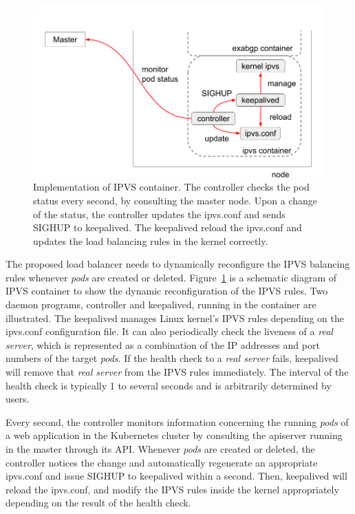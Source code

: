 \begin{figure}[h]
  \centering
  \includegraphics[width=0.9\columnwidth]{Figs/ipvs-ingress-schem}
  
    \par\bigskip
    \centering
    \begin{minipage}{0.9\columnwidth}
      \caption[Implementation of IPVS container]{
        Implementation of IPVS container.
        The controller checks the pod status every second, by consulting the master node.
        Upon a change of the status, the controller updates the ipvs.conf and sends SIGHUP to keepalived.
        The keepalived reload the ipvs.conf and updates the load balancing rules in the kernel correctly.
      }
      \label{fig:ipvs-ingress-schem}
    \end{minipage}
\end{figure}

The proposed load balancer needs to dynamically reconfigure the IPVS balancing rules whenever {\em pods} are created or deleted. 
Figure~\ref{fig:ipvs-ingress-schem} is a schematic diagram of IPVS container to show the dynamic reconfiguration of the IPVS rules.
Two daemon programs, controller and keepalived, running in the container are illustrated.
The keepalived manages Linux kernel's IPVS rules depending on the ipvs.conf configuration file.
It can also periodically check the liveness of a {\em real server}, which is represented as a combination of the IP addresses and port numbers of the target {\em pods}. 
If the health check to a {\em real server} fails, keepalived will remove that {\em real server} from the IPVS rules immediately.
The interval of the health check is typically 1 to several seconds and is arbitrarily determined by users.  

Every second, the controller monitors information concerning the running {\em pods} of a web application in the Kubernetes cluster by consulting the apiserver running in the master through its API.
Whenever {\em pods} are created or deleted, the controller notices the change and automatically regenerate an appropriate ipvs.conf 
and issue SIGHUP to keepalived within a second.
Then, keepalived will reload the ipvs.conf, and modify the IPVS rules inside the kernel appropriately depending on the result of the health check.

